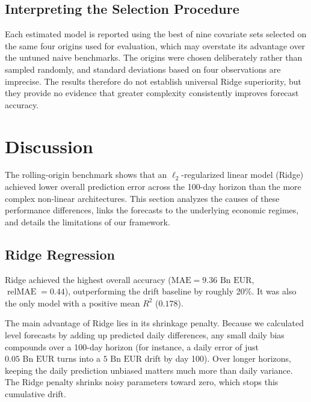 \documentclass[11pt,a4paper]{article}
\begin{document}
\subsection{Interpreting the Selection Procedure}
\label{subsec:selection}

Each estimated model is reported using the best
of nine covariate sets selected on the same four origins used for evaluation,
which may overstate its advantage over the untuned naive benchmarks. The
origins were chosen deliberately rather than sampled randomly, and standard
deviations based on four observations are imprecise. The results therefore do
not establish universal Ridge superiority, but they provide no evidence that
greater complexity consistently improves forecast accuracy.







\section{Discussion}
\label{sec:discussion}

The rolling-origin benchmark shows that an $\ell_2$-regularized linear model (Ridge) achieved lower overall prediction error across the 100-day horizon than the more complex non-linear architectures. This section analyzes the causes of these performance differences, links the forecasts to the underlying economic regimes, and details the limitations of our framework.

\subsection{Ridge Regression}
Ridge achieved the highest overall accuracy ($\text{MAE} = 9.36\text{ Bn EUR}$, $\operatorname{relMAE} = 0.44$), outperforming the drift baseline by roughly 20\%. It was also the only model with a positive mean $R^2$ ($0.178$).

The main advantage of Ridge lies in its shrinkage penalty. Because we calculated level forecasts by adding up predicted daily differences, any small daily bias compounds over a 100-day horizon (for instance, a daily error of just $0.05\text{ Bn EUR}$ turns into a $5\text{ Bn EUR}$ drift by day 100). Over longer horizons, keeping the daily prediction unbiased matters much more than daily variance. The Ridge penalty shrinks noisy parameters toward zero, which stops this cumulative drift.
\end{document}
